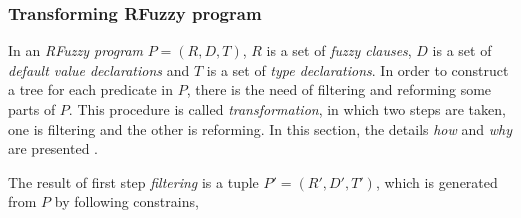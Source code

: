 \subsubsection{Transforming RFuzzy program}
\label{sec:TransformRFuzzy}
In an \textit{RFuzzy program} $P=(R,D,T)$, $R$ is a set of \textit{fuzzy clauses}, $D$ is a set of \textit{default value declarations} and $T$ is a set of \textit{type declarations}. In order to construct a tree for each predicate in $P$, there is the need of filtering and reforming some parts of $P$. This procedure is called \textit{transformation}, in which two steps are taken, one is filtering and the other is reforming. In this section, the details \textit{how} and \textit{why} are presented \cite{Lu}. 

The result of first step \textit{filtering} is a tuple $P'=(R',D',T')$, which is generated from $P$ by following constrains,
